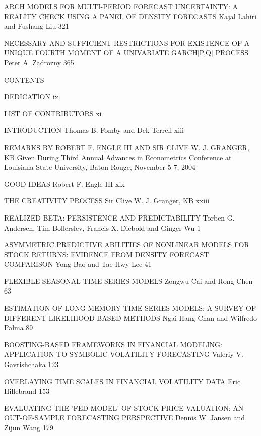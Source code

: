 ARCH MODELS FOR MULTI-PERIOD FORECAST UNCERTAINTY: A REALITY CHECK USING A PANEL OF DENSITY FORECASTS
Kajal Lahiri and Fushang Liu 321



NECESSARY AND SUFFICIENT RESTRICTIONS FOR EXISTENCE OF A UNIQUE FOURTH MOMENT OF A UNIVARIATE GARCH[P,Q] PROCESS
Peter A. Zadrozny 365



CONTENTS



DEDICATION ix



LIST OF CONTRIBUTORS xi



INTRODUCTION
Thomas B. Fomby and Dek Terrell xiii



REMARKS BY ROBERT F. ENGLE III AND SIR CLIVE W. J. GRANGER, KB
Given During Third Annual Advances in Econometrics Conference at Louisiana State University, Baton Rouge, November 5-7, 2004



GOOD IDEAS
Robert F. Engle III xix



THE CREATIVITY PROCESS
Sir Clive W. J. Granger, KB xxiii



REALIZED BETA: PERSISTENCE AND PREDICTABILITY
Torben G. Andersen, Tim Bollerslev, Francis X. Diebold and Ginger Wu 1



ASYMMETRIC PREDICTIVE ABILITIES OF NONLINEAR MODELS FOR STOCK RETURNS: EVIDENCE FROM DENSITY FORECAST COMPARISON
Yong Bao and Tae-Hwy Lee 41



FLEXIBLE SEASONAL TIME SERIES MODELS
Zongwu Cai and Rong Chen 63



ESTIMATION OF LONG-MEMORY TIME SERIES MODELS: A SURVEY OF DIFFERENT LIKELIHOOD-BASED METHODS
Ngai Hang Chan and Wilfredo Palma 89



BOOSTING-BASED FRAMEWORKS IN FINANCIAL MODELING: APPLICATION TO SYMBOLIC VOLATILITY FORECASTING
Valeriy V. Gavrishchaka 123



OVERLAYING TIME SCALES IN FINANCIAL VOLATILITY DATA
Eric Hillebrand 153



EVALUATING THE 'FED MODEL' OF STOCK PRICE VALUATION: AN OUT-OF-SAMPLE FORECASTING PERSPECTIVE
Dennis W. Jansen and Zijun Wang 179



